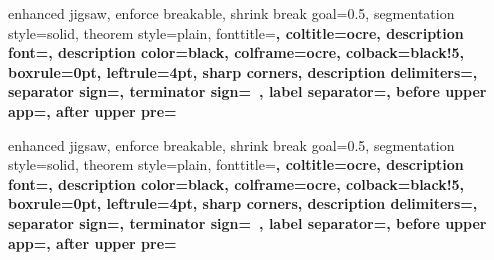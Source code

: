 %
{enhanced jigsaw,%
	enforce breakable,%
	shrink break goal=0.5\baselineskip,%
	segmentation style=solid,%
	theorem style=plain,%
	fonttitle=\sffamily\upshape\bfseries\small,%
	coltitle=ocre,%
	description font=\sffamily\upshape\bfseries\small,%
	description color=black,%
	colframe=ocre,%
	colback=black!5,%
	boxrule=0pt,%
	leftrule=4pt,%
	sharp corners,%
	description delimiters={}{},%
	separator sign={\nobreakspace {\color{black}---}},%
	terminator sign={\ },%
	label separator=,%
	before upper app={},%
	after upper pre={\popdimen{\parindent}}}%
{}

%
{enhanced jigsaw,%
	enforce breakable,%
	shrink break goal=0.5\baselineskip,%
	segmentation style=solid,%
	theorem style=plain,%
	fonttitle=\sffamily\upshape\bfseries\small,%
	coltitle=ocre,%
	description font=\sffamily\upshape\bfseries\small,%
	description color=black,%
	colframe=ocre,%
	colback=black!5,%
	boxrule=0pt,%
	leftrule=4pt,%
	sharp corners,%
	description delimiters={}{},%
	separator sign={\nobreakspace {\color{black}---}},%
	terminator sign={\ },%
	label separator=,
	before upper app={},%
	after upper pre={\popdimen{\parindent}}}%
{}

